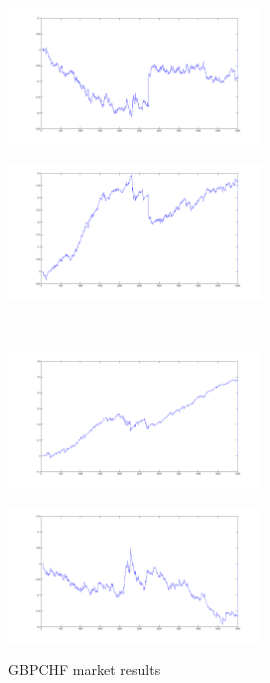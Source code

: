 \documentclass{tewiart}
\begin{document}
\begin{figure}[h]
\centering
\begin{minipage}{\linewidth}
\centering
\includegraphics[width=0.6\textwidth]{images/gbpchfA.png}
\label{jedno}
\end{minipage}
\begin{minipage}{\linewidth}
\centering
\includegraphics[width=0.6\textwidth]{images/gbpchfB.png}
\label{dwu}
\end{minipage}
\\
\begin{minipage}{\linewidth}
\centering
\includegraphics[width=0.6\textwidth]{images/gbpchfC.png}
\label{cztero}
\end{minipage}
\begin{minipage}{\linewidth}
\centering
\includegraphics[width=0.6\textwidth]{images/gbpchfD.png}
\label{mansard}
\end{minipage}
\caption{GBPCHF market results}
\end{figure}
\end{document}
